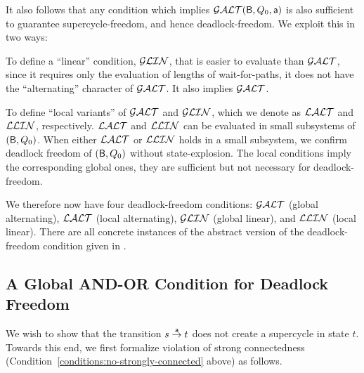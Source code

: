 It also follows that any condition which implies $\GAO(\B, Q_0, \act)$ is also sufficient to guarantee  supercycle-freedom, and
hence deadlock-freedom. We exploit this in two ways:
\bn

\item To define a ``linear'' condition, $\GLin$, that is easier to evaluate than $\GAO$, since it requires only the
evaluation of lengths of wait-for-paths, \ie it does not have the ``alternating'' character of $\GAO$.  It also implies $\GAO$.

\item To define ``local variants'' of $\GAO$ and $\GLin$, which we denote as $\LAO$ and $\LLin$, respectively.  $\LAO$ and $\LLin$ can be evaluated in
  small subsystems of $(\B, Q_0)$. When either $\LAO$ or $\LLin$ holds in a small subsystem, we confirm deadlock freedom of $(\B, Q_0)$ without
  state-explosion. The local conditions imply the corresponding global ones, \ie they are sufficient but not necessary for deadlock-freedom.

\en
%
We therefore now have four deadlock-freedom conditions: $\GAO$ (global alternating), $\LAO$ (local alternating), $\GLin$ (global linear), and $\LLin$
(local linear). There are all concrete instances of the abstract version of the deadlock-freedom condition given in .





   \subsection{A Global AND-OR Condition for Deadlock Freedom}
   \label{s:global.ANDOR}
%   


%

We wish to show that the transition $s \goesto[\act] t$
does not create a supercycle in state $t$.
Towards this end, we first formalize violation of strong connectedness
(Condition~\ref{conditions:no-strongly-connected} above) as follows.

